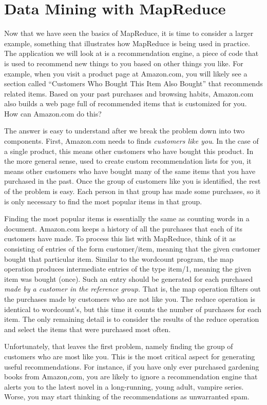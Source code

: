 \section{Data Mining with MapReduce}

Now that we have seen the basics of MapReduce, it is time to consider
a larger example, something that illustrates how MapReduce is being
used in practice.  The application we will look at is a recommendation
engine, a piece of code that is used to recommend new things to you based
on other things you like.  For example, when you visit a product page at
Amazon.com, you will likely see a section called ``Customers Who Bought
This Item Also Bought'' that recommends related items.  Based on your
past purchases and browsing habits, Amazon.com also builds a web page
full of recommended items that is customized for you.  How can Amazon.com
do this?

The answer is easy to understand after we break the problem down into
two components.  First, Amazon.com needs to finds \textit{customers like
you}.  In the case of a single product, this means other customers who
have bought this product.  In the more general sense, used to create custom
recommendation lists for you, it means other customers who have bought many
of the same items that you have purchased in the past.  Once the group of
customers like you is identified, the rest of the problem is easy.  Each
person in that group has made some purchases, so it is only necessary to
find the most popular items in that group.

Finding the most popular items is essentially the same as counting words
in a document.
Amazon.com keeps a history of all the purchases that each of its
customers have made.  To process this list with MapReduce, think of it as
consisting of entries of the form customer/item, meaning that the given
customer bought that particular item.  Similar to the wordcount program,
the map operation produces intermediate entries of the type item/1, meaning
the given item was bought (once).  Such an entry should be generated for
each purchased \textit{made by a customer in the reference group.}  That is,
the map operation filters out the purchases made by customers who are
not like you.  The reduce operation is identical to wordcount's, but this
time it counts the number of purchases for each item.  The only remaining
detail is to consider the results of the reduce operation and select the
items that were purchased most often.

Unfortunately, that leaves the first problem, namely finding the group of
customers who are most like you.  This is the most critical aspect for
generating useful recommendations.  For instance, if you have only ever
purchased gardening books from Amazon,com, you are likely to ignore a
recommendation engine that alerts you to the latest novel in a long-running,
young adult, vampire series.  Worse, you may start thinking of the recommendations
as unwarranted spam.

